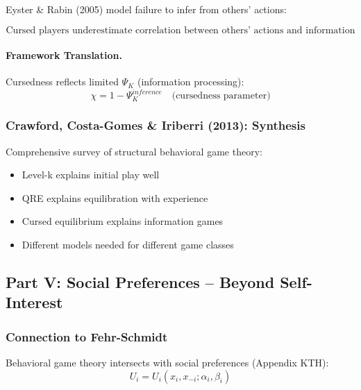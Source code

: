 Eyster \& Rabin (2005) model failure to infer from others' actions:

\begin{equation}
\boxed{
\text{Cursed players underestimate correlation between others' actions and information}
}
\label{eq:cursed}
\end{equation}

\paragraph{Framework Translation.}
Cursedness reflects limited $\Psi_K$ (information processing):
\begin{equation}
\chi = 1 - \Psi_K^{inference} \quad \text{(cursedness parameter)}
\end{equation}

\subsubsection{Crawford, Costa-Gomes \& Iriberri (2013): Synthesis}

Comprehensive survey of structural behavioral game theory:
\begin{itemize}
    \item Level-k explains initial play well
    \item QRE explains equilibration with experience
    \item Cursed equilibrium explains information games
    \item Different models needed for different game classes
\end{itemize}

\subsection{Part V: Social Preferences – Beyond Self-Interest}

\subsubsection{Connection to Fehr-Schmidt}

Behavioral game theory intersects with social preferences (Appendix KTH):
\begin{equation}
U_i = U_i(x_i, x_{-i}; \alpha_i, \beta_i)
\end{equation}

